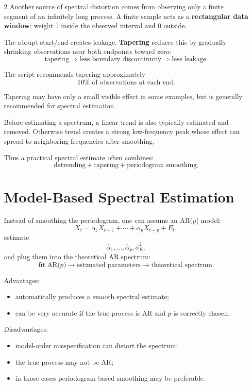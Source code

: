 \documentclass[9pt,a4paper]{extarticle}
\newcommand{\key}[1]{\textbf{#1}}
\begin{document}
\begin{multicols}{2}
Another source of spectral distortion comes from observing only a finite segment of an infinitely long process. A finite sample acts as a \key{rectangular data window}: weight 1 inside the observed interval and 0 outside.

The abrupt start/end creates leakage. \key{Tapering} reduces this by gradually shrinking observations near both endpoints toward zero:
\[
\boxed{\text{tapering}\Rightarrow\text{less boundary discontinuity}\Rightarrow\text{less leakage}.}
\]

The script recommends tapering approximately
\[
\boxed{10\%\text{ of observations at each end}.}
\]

Tapering may have only a small visible effect in some examples, but is generally recommended for spectral estimation.

Before estimating a spectrum, a linear trend is also typically estimated and removed. Otherwise trend creates a strong low-frequency peak whose effect can spread to neighboring frequencies after smoothing.

Thus a practical spectral estimate often combines:
\[
\boxed{
\text{detrending}
+\text{tapering}
+\text{periodogram smoothing}.
}
\]

\section{Model-Based Spectral Estimation}

Instead of smoothing the periodogram, one can assume an AR($p$) model:
\[
X_t=\alpha_1X_{t-1}+\cdots+\alpha_pX_{t-p}+E_t,
\]
estimate
\[
\widehat\alpha_1,\ldots,\widehat\alpha_p,
\widehat\sigma_E^2,
\]
and plug them into the theoretical AR spectrum:
\[
\boxed{
\text{fit AR($p$)}
\rightarrow
\text{estimated parameters}
\rightarrow
\text{theoretical spectrum}.
}
\]

Advantages:
\begin{itemize}
\item automatically produces a smooth spectral estimate;
\item can be very accurate if the true process is AR and \(p\) is correctly chosen.
\end{itemize}

Disadvantages:
\begin{itemize}
\item model-order misspecification can distort the spectrum;
\item the true process may not be AR;
\item in those cases periodogram-based smoothing may be preferable.
\end{itemize}


\end{multicols}
\end{document}
